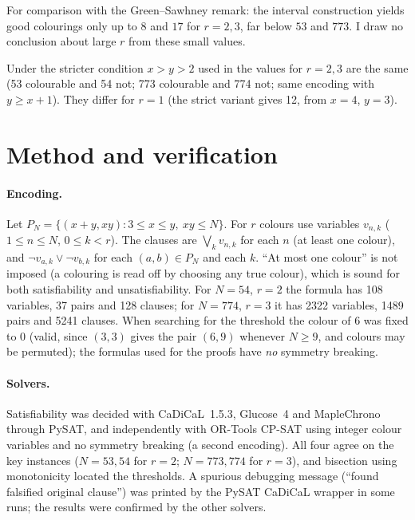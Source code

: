 \documentclass[11pt]{article}
\begin{document}
For comparison with the Green--Sawhney remark: the interval construction yields good colourings only up to $8$ and $17$ for $r=2,3$, far below $53$ and $773$. I draw no conclusion about large $r$ from these small values.

Under the stricter condition $x>y>2$ used in \cite{gs} the values for $r=2,3$ are the same (53 colourable and 54 not; 773 colourable and 774 not; same encoding with $y\ge x+1$). They differ for $r=1$ (the strict variant gives 12, from $x=4$, $y=3$).

\section{Method and verification}
\paragraph{Encoding.} Let $P_N=\{(x+y,xy): 3\le x\le y,\ xy\le N\}$. For $r$ colours use variables $v_{n,k}$ ($1\le n\le N$, $0\le k<r$). The clauses are $\bigvee_k v_{n,k}$ for each $n$ (at least one colour), and $\neg v_{a,k}\vee\neg v_{b,k}$ for each $(a,b)\in P_N$ and each $k$. ``At most one colour'' is not imposed (a colouring is read off by choosing any true colour), which is sound for both satisfiability and unsatisfiability. For $N=54$, $r=2$ the formula has 108 variables, 37 pairs and 128 clauses; for $N=774$, $r=3$ it has 2322 variables, 1489 pairs and 5241 clauses. When searching for the threshold the colour of $6$ was fixed to $0$ (valid, since $(3,3)$ gives the pair $(6,9)$ whenever $N\ge9$, and colours may be permuted); the formulas used for the proofs have \emph{no} symmetry breaking.

\paragraph{Solvers.} Satisfiability was decided with CaDiCaL~1.5.3, Glucose~4 and MapleChrono through PySAT, and independently with OR-Tools CP-SAT using integer colour variables and no symmetry breaking (a second encoding). All four agree on the key instances ($N=53,54$ for $r=2$; $N=773,774$ for $r=3$), and bisection using monotonicity located the thresholds. A spurious debugging message (``found falsified original clause'') was printed by the PySAT CaDiCaL wrapper in some runs; the results were confirmed by the other solvers.
\end{document}
